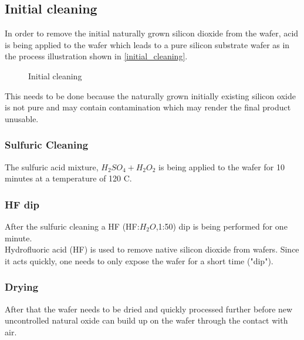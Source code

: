 \newpage

\subsection{Initial cleaning}
In order to remove the initial naturally grown silicon dioxide from the wafer, acid is being applied to the wafer which leads to a pure silicon substrate wafer as in the process illustration shown in \autoref{initial_cleaning}.

\begin{figure}[H]
	\centering
	\begin{tikzpicture}[node distance = 3cm, auto, thick,scale=\CrossSectionOnly, every node/.style={transform shape}]
		
	\end{tikzpicture}
	\drawStepArrow{}
	\begin{tikzpicture}[node distance = 3cm, auto, thick,scale=\CrossSectionOnly, every node/.style={transform shape}]
		
	\end{tikzpicture}
	\caption{Initial cleaning}
	\label{initial_cleaning}
\end{figure}

This needs to be done because the naturally grown initially existing silicon oxide is not pure and may contain contamination which may render the final product unusable.

\subsubsection{Sulfuric Cleaning}
The sulfuric acid mixture, $H_2 S O_4 + H_2 O_2$ is being applied to the wafer for 10 minutes at a temperature of 120 \degree C.

\subsubsection{HF dip}
After the sulfuric cleaning a HF (HF:$H_2O$,1:50) dip is being performed for one minute. \\
Hydrofluoric acid (HF) is used to remove native silicon dioxide from wafers. Since it acts quickly, one needs to only expose the wafer for a short time ("dip").

\subsubsection{Drying}
After that the wafer needs to be dried and quickly processed further before new uncontrolled natural oxide can build up on the wafer through the contact with air.

